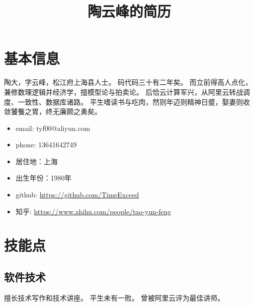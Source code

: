 \documentclass[scheme=plain]{ctexart}
\title{陶云峰的简历}
\begin{document}
\maketitle

\section{基本信息}

陶大，字云峰，松江府上海县人士。
码代码三十有二年矣。
而立前得高人点化，兼修数理逻辑并经济学，擅模型论与拍卖论。
后恰云计算军兴，从阿里云转战调度、一致性、数据库诸路。
平生嗜读书与吃肉，然则年迈则精神日蹙，娶妻则收敛饕餮之胃，终无廉颇之勇矣。

\begin{itemize}
    \item email: tyf00@aliyun.com
    \item phone: 13641642749
    \item 居住地：上海
    \item 出生年份：1980年
    \item github: \url{https://github.com/TimeExceed}
    \item 知乎: \url{https://www.zhihu.com/people/tao-yun-feng}
\end{itemize}

\section{技能点}

\subsection{软件技术}

擅长技术写作和技术讲座。
平生未有一败。
曾被阿里云评为最佳讲师。
\end{document}
